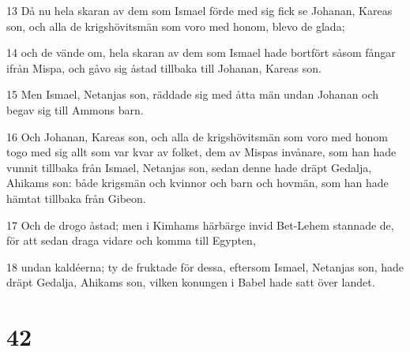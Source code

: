 \par 13 Då nu hela skaran av dem som Ismael förde med sig fick se Johanan, Kareas son, och alla de krigshövitsmän som voro med honom, blevo de glada;
\par 14 och de vände om, hela skaran av dem som Ismael hade bortfört såsom fångar ifrån Mispa, och gåvo sig åstad tillbaka till Johanan, Kareas son.
\par 15 Men Ismael, Netanjas son, räddade sig med åtta män undan Johanan och begav sig till Ammons barn.
\par 16 Och Johanan, Kareas son, och alla de krigshövitsmän som voro med honom togo med sig allt som var kvar av folket, dem av Mispas invånare, som han hade vunnit tillbaka från Ismael, Netanjas son, sedan denne hade dräpt Gedalja, Ahikams son: både krigsmän och kvinnor och barn och hovmän, som han hade hämtat tillbaka från Gibeon.
\par 17 Och de drogo åstad; men i Kimhams härbärge invid Bet-Lehem stannade de, för att sedan draga vidare och komma till Egypten,
\par 18 undan kaldéerna; ty de fruktade för dessa, eftersom Ismael, Netanjas son, hade dräpt Gedalja, Ahikams son, vilken konungen i Babel hade satt över landet.

\chapter{42}

